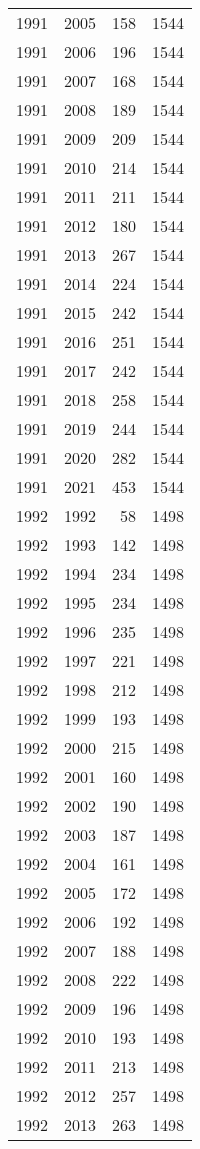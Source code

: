 \documentclass[
  11pt,
  letterpaper,
  DIV=11,
  numbers=noendperiod,
  twoside]{scrartcl}
\begin{document}
\begin{longtable}[]{@{}rrrr@{}}
1991 & 2005 & 158 & 1544 \\
1991 & 2006 & 196 & 1544 \\
1991 & 2007 & 168 & 1544 \\
1991 & 2008 & 189 & 1544 \\
1991 & 2009 & 209 & 1544 \\
1991 & 2010 & 214 & 1544 \\
1991 & 2011 & 211 & 1544 \\
1991 & 2012 & 180 & 1544 \\
1991 & 2013 & 267 & 1544 \\
1991 & 2014 & 224 & 1544 \\
1991 & 2015 & 242 & 1544 \\
1991 & 2016 & 251 & 1544 \\
1991 & 2017 & 242 & 1544 \\
1991 & 2018 & 258 & 1544 \\
1991 & 2019 & 244 & 1544 \\
1991 & 2020 & 282 & 1544 \\
1991 & 2021 & 453 & 1544 \\
1992 & 1992 & 58 & 1498 \\
1992 & 1993 & 142 & 1498 \\
1992 & 1994 & 234 & 1498 \\
1992 & 1995 & 234 & 1498 \\
1992 & 1996 & 235 & 1498 \\
1992 & 1997 & 221 & 1498 \\
1992 & 1998 & 212 & 1498 \\
1992 & 1999 & 193 & 1498 \\
1992 & 2000 & 215 & 1498 \\
1992 & 2001 & 160 & 1498 \\
1992 & 2002 & 190 & 1498 \\
1992 & 2003 & 187 & 1498 \\
1992 & 2004 & 161 & 1498 \\
1992 & 2005 & 172 & 1498 \\
1992 & 2006 & 192 & 1498 \\
1992 & 2007 & 188 & 1498 \\
1992 & 2008 & 222 & 1498 \\
1992 & 2009 & 196 & 1498 \\
1992 & 2010 & 193 & 1498 \\
1992 & 2011 & 213 & 1498 \\
1992 & 2012 & 257 & 1498 \\
1992 & 2013 & 263 & 1498 \\

\end{longtable}
\end{document}
